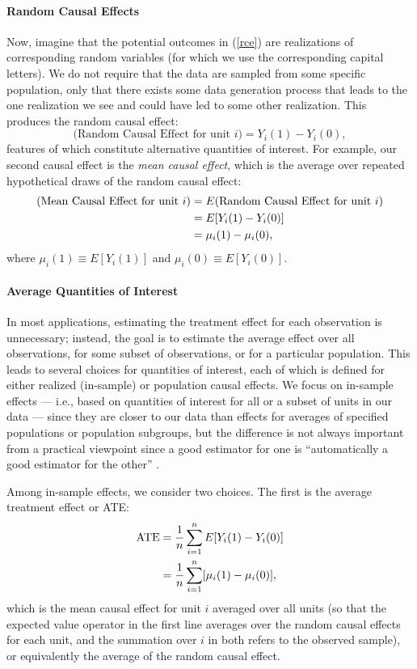 \documentclass[11pt,titlepage]{article}
\begin{document}
\paragraph{Random Causal Effects} 
Now, imagine that the potential outcomes in (\ref{rce}) are
realizations of corresponding random variables (for which we use the
corresponding capital letters).  We do not require that the data are
sampled from some specific population, only that there exists some
data generation process that leads to the one realization we see and
could have led to some other realization.  This produces the random
causal effect:
\begin{equation}
  \label{rance}
  \text{(Random Causal Effect for unit $i$)}  = Y_i(1) - Y_i(0),
\end{equation}
features of which constitute alternative quantities of interest.  For
example, our second causal effect is the \emph{mean causal effect},
which is the average over repeated hypothetical draws of the random
causal effect:
\begin{align}
  \label{meance} \text{(Mean Causal Effect for unit $i$)}
  &= E(\text{Random Causal Effect for unit $i$})\\
  &= E[Y_i(1) - Y_i(0)]\\ \notag &= \mu_i(1) - \mu_i(0),
\end{align}
where $\mu_i(1)\equiv E[Y_i(1)]$ and $\mu_i(0)\equiv E[Y_i(0)]$.

\paragraph{Average Quantities of Interest}
In most applications, estimating the treatment effect for each
observation is unnecessary; instead, the goal is to estimate the
average effect over all observations, for some subset of observations,
or for a particular population.  This leads to several choices for
quantities of interest, each of which is defined for either realized
(in-sample) or population causal effects.  We focus on in-sample
effects --- i.e., based on quantities of interest for all or a subset
of units in our data --- since they are closer to our data than
effects for averages of specified populations or population subgroups,
but the difference is not always important from a practical viewpoint
since a good estimator for one is ``automatically a good estimator for
the other'' \citep[p.6]{Imbens04}.

Among in-sample effects, we consider two choices.  The first is the
average treatment effect or ATE:
\begin{align}
  \label{pate}
  \text{ATE} & = \frac{1}{n}\sum_{i=1}^n E[Y_i(1) - Y_i(0)] \notag\\
  &  = \frac{1}{n}\sum_{i=1}^n[\mu_i(1) - \mu_i(0)],
\end{align}
which is the mean causal effect for unit $i$ averaged over all units
(so that the expected value operator in the first line averages over
the random causal effects for each unit, and the summation over $i$ in
both refers to the observed sample), or equivalently the average of
the random causal effect.
\end{document}
